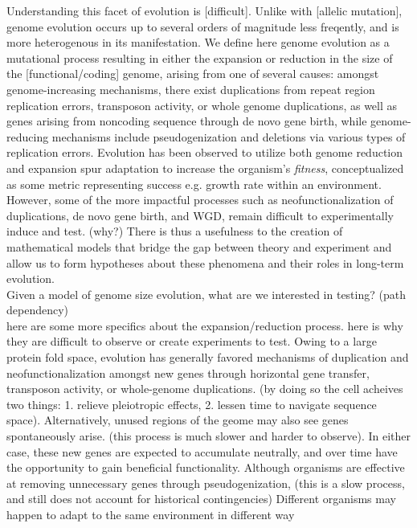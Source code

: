 \documentclass[paper=a4, fontsize=11pt,twoside]{scrartcl}       %
\begin{document}
Understanding this facet of evolution is [difficult]. Unlike with [allelic mutation], genome evolution occurs up to several orders of magnitude less freqently, and is more heterogenous in its manifestation. We define here genome evolution as a mutational process resulting in either the expansion or reduction in the size of the [functional/coding] genome, arising from one of several causes: amongst genome-increasing mechanisms, there exist duplications from repeat region replication errors, transposon activity, or whole genome duplications, as well as genes arising from noncoding sequence through de novo gene birth, while genome-reducing mechanisms include pseudogenization and deletions via various types of replication errors. Evolution has been observed to utilize both genome reduction and expansion spur adaptation to increase the organism's \textit{fitness}, conceptualized as some metric representing success e.g. growth rate within an environment. However, some of the more impactful processes such as neofunctionalization of duplications, de novo gene birth, and WGD, remain difficult to experimentally induce and test. (why?) There is thus a usefulness to the creation of mathematical models that bridge the gap between theory and experiment and allow us to form hypotheses about these phenomena and their roles in long-term evolution.\\

Given a model of genome size evolution, what are we interested in testing? (path dependency)\\

here are some more specifics about the expansion/reduction process. here is why they are difficult to observe or create experiments to test.
Owing to a large protein fold space, evolution has generally favored mechanisms of duplication and neofunctionalization amongst new genes through horizontal gene transfer, transposon activity, or whole-genome duplications. (by doing so the cell acheives two things: 1. relieve pleiotropic effects, 2. lessen time to navigate sequence space). Alternatively, unused regions of the geome may also see genes spontaneously arise. (this process is much slower and harder to observe). In either case, these new genes are expected to accumulate neutrally, and over time have the opportunity to gain beneficial functionality. 
Although organisms are effective at removing unnecessary genes through pseudogenization, (this is a slow process, and still does not account for historical contingencies)
Different organisms may happen to adapt to the same environment in different way
\end{document}
